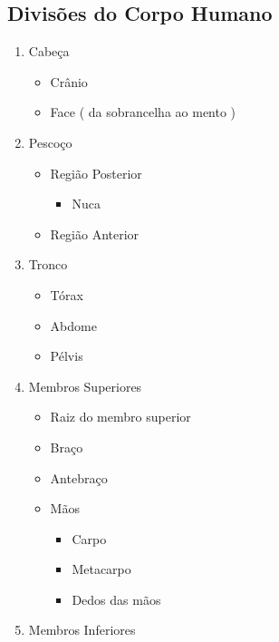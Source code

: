 \documentclass[
]{book}
\providecommand{\tightlist}{%
  \setlength{\itemsep}{0pt}\setlength{\parskip}{0pt}}
\begin{document}
\hypertarget{divisuxf5es-do-corpo-humano}{%
\subsection{Divisões do Corpo Humano}\label{divisuxf5es-do-corpo-humano}}

\begin{enumerate}
\def\labelenumi{\arabic{enumi}.}
\tightlist
\item
  Cabeça

  \begin{itemize}
  \tightlist
  \item
    Crânio
  \item
    Face ( da sobrancelha ao mento )
  \end{itemize}
\item
  Pescoço

  \begin{itemize}
  \tightlist
  \item
    Região Posterior

    \begin{itemize}
    \tightlist
    \item
      Nuca
    \end{itemize}
  \item
    Região Anterior
  \end{itemize}
\item
  Tronco

  \begin{itemize}
  \tightlist
  \item
    Tórax
  \item
    Abdome
  \item
    Pélvis
  \end{itemize}
\item
  Membros Superiores

  \begin{itemize}
  \tightlist
  \item
    Raiz do membro superior
  \item
    Braço
  \item
    Antebraço
  \item
    Mãos

    \begin{itemize}
    \tightlist
    \item
      Carpo
    \item
      Metacarpo
    \item
      Dedos das mãos
    \end{itemize}
  \end{itemize}
\item
  Membros Inferiores


\end{enumerate}
\end{document}

